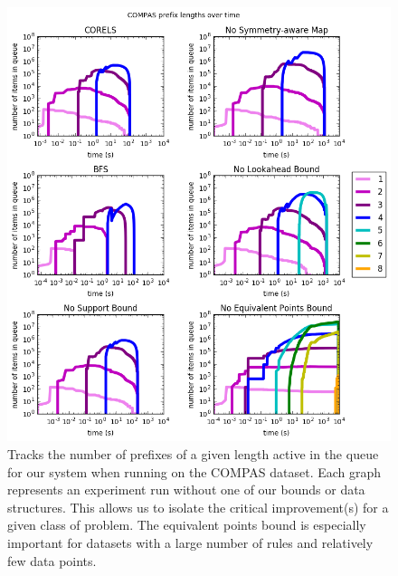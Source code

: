 \begin{figure}
\begin{center}
\includegraphics[width=1.1\textwidth]{figs/compas_prefixes.png}
\end{center}
\caption{Tracks the number of prefixes of a given length active in the queue for our system when running on the COMPAS dataset.
Each graph represents an experiment run without one of our bounds or data structures.
This allows us to isolate the critical improvement(s) for a given class of problem.
The equivalent points bound is especially important for datasets with a large number of rules and relatively few data points.
}
\label{fig:compas-prefixes}
\end{figure}

